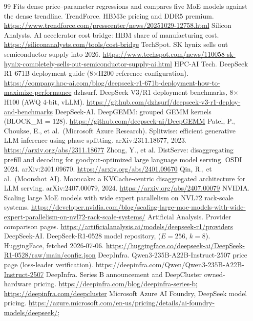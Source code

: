 \documentclass[11pt]{article}
\begin{document}
\begin{thebibliography}{99}
Fits dense price--parameter regressions and compares five MoE models against
the dense trendline.
 TrendForce. HBM3e pricing and DDR5 premium.
\url{https://www.trendforce.com/presscenter/news/20251029-12758.html}
 Silicon Analysts. AI accelerator cost bridge: HBM share of
manufacturing cost. \url{https://siliconanalysts.com/tools/cost-bridge}
 TechSpot. SK hynix sells out semiconductor supply into 2026.
\url{https://www.techspot.com/news/110058-sk-hynix-completely-sells-out-semiconductor-supply-ai.html}
 HPC-AI Tech. DeepSeek R1 671B deployment guide (8$\times$H200
reference configuration).
\url{https://company.hpc-ai.com/blog/deepseek-r1-671b-deployment-how-to-maximize-performance}
 dzhsurf. DeepSeek V3/R1 deployment benchmarks, 8$\times$H100 (AWQ
4-bit, vLLM).
\url{https://github.com/dzhsurf/deepseek-v3-r1-deploy-and-benchmarks}
 DeepSeek-AI. DeepGEMM: grouped GEMM kernels
(BLOCK\_M = 128). \url{https://github.com/deepseek-ai/DeepGEMM}
 Patel, P., Choukse, E., et al.\ (Microsoft Azure Research).
Splitwise: efficient generative LLM inference using phase splitting.
arXiv:2311.18677, 2023. \url{https://arxiv.org/abs/2311.18677}
 Zhong, Y., et al. DistServe: disaggregating prefill and decoding
for goodput-optimized large language model serving. OSDI 2024.
arXiv:2401.09670. \url{https://arxiv.org/abs/2401.09670}
 Qin, R., et al.\ (Moonshot AI). Mooncake: a KVCache-centric
disaggregated architecture for LLM serving. arXiv:2407.00079, 2024.
\url{https://arxiv.org/abs/2407.00079}
 NVIDIA. Scaling large MoE models with wide expert parallelism on
NVL72 rack-scale systems.
\url{https://developer.nvidia.com/blog/scaling-large-moe-models-with-wide-expert-parallelism-on-nvl72-rack-scale-systems/}
 Artificial Analysis. Provider comparison pages.
\url{https://artificialanalysis.ai/models/deepseek-r1/providers}
 DeepSeek-AI. DeepSeek-R1-0528 model repository,
 ($E{=}256$, $k{=}8$). HuggingFace, fetched 2026-07-06.
\url{https://huggingface.co/deepseek-ai/DeepSeek-R1-0528/raw/main/config.json}
 DeepInfra. Qwen3-235B-A22B-Instruct-2507 price page
(loss-leader verification).
\url{https://deepinfra.com/Qwen/Qwen3-235B-A22B-Instruct-2507}
 DeepInfra. Series B announcement and DeepCluster owned-hardware
pricing. \url{https://deepinfra.com/blog/deepinfra-series-b};
\url{https://deepinfra.com/deepcluster}
 Microsoft Azure AI Foundry, DeepSeek model pricing.
\url{https://azure.microsoft.com/en-us/pricing/details/ai-foundry-models/deepseek/};

\end{thebibliography}
\end{document}
